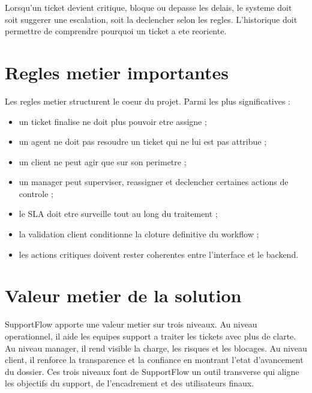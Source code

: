 Lorsqu'un ticket devient critique, bloque ou depasse les delais, le systeme doit soit suggerer une escalation, soit la declencher selon les regles. L'historique doit permettre de comprendre pourquoi un ticket a ete reoriente.

\section{Regles metier importantes}

Les regles metier structurent le coeur du projet. Parmi les plus significatives :

\begin{itemize}[leftmargin=1.2cm]
  \item un ticket finalise ne doit plus pouvoir etre assigne ;
  \item un agent ne doit pas resoudre un ticket qui ne lui est pas attribue ;
  \item un client ne peut agir que sur son perimetre ;
  \item un manager peut superviser, reassigner et declencher certaines actions de controle ;
  \item le SLA doit etre surveille tout au long du traitement ;
  \item la validation client conditionne la cloture definitive du workflow ;
  \item les actions critiques doivent rester coherentes entre l'interface et le backend.
\end{itemize}

\section{Valeur metier de la solution}

SupportFlow apporte une valeur metier sur trois niveaux. Au niveau operationnel, il aide les equipes support a traiter les tickets avec plus de clarte. Au niveau manager, il rend visible la charge, les risques et les blocages. Au niveau client, il renforce la transparence et la confiance en montrant l'etat d'avancement du dossier. Ces trois niveaux font de SupportFlow un outil transverse qui aligne les objectifs du support, de l'encadrement et des utilisateurs finaux.


